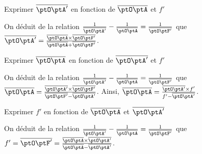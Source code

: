 \begin{enonce}
Exprimer $\overline{\ptO\ptA'}$ en fonction de  $\overline{\ptO\ptA}$ et $f'$
\end{enonce}


\begin{corrige}
On déduit de la relation $\frac{1}{\overline{\ptO\ptA'}}-\frac{1}{\overline{\ptO\ptA}}=\frac{1}{\overline{\ptO\ptF'}}$ que $\overline{\ptO\ptA'}=\frac{\overline{\ptO\ptA}\times\overline{\ptO\ptF'}}{\overline{\ptO\ptA}+\overline{\ptO\ptF'}}$. 
\end{corrige}




\begin{enonce}
Exprimer $\overline{\ptO\ptA}$ en fonction de  $\overline{\ptO\ptA'}$ et $f'$
\end{enonce}


\begin{corrige}
On déduit de la relation  $\frac{1}{\overline{\ptO\ptA'}}-\frac{1}{\overline{\ptO\ptA}}=\frac{1}{\overline{\ptO\ptF'}}$ que $\overline{\ptO\ptA}=\frac{\overline{\ptO\ptA'}\times\overline{\ptO\ptF'}}{\overline{\ptO\ptF'}-\overline{\ptO\ptA'}}$. Ainsi, 
$\overline{\ptO\ptA} = \frac{\overline{\ptO\ptA'}\times{f'}}{f'-\overline{\ptO\ptA'}}$.
\end{corrige}




\begin{enonce}
Exprimer $f'$ en fonction de $\overline{\ptO\ptA}$ et $\overline{\ptO\ptA'}$
\end{enonce}


\begin{corrige}
On déduit de la relation  $\frac{1}{\overline{\ptO\ptA'}}-\frac{1}{\overline{\ptO\ptA}}=\frac{1}{\overline{\ptO\ptF'}}$ 
que $f'=\overline{\ptO\ptF'}=\frac{\overline{\ptO\ptA}\times\overline{\ptO\ptA'}}{\overline{\ptO\ptA}-\overline{\ptO\ptA'}}$. 
\end{corrige}

